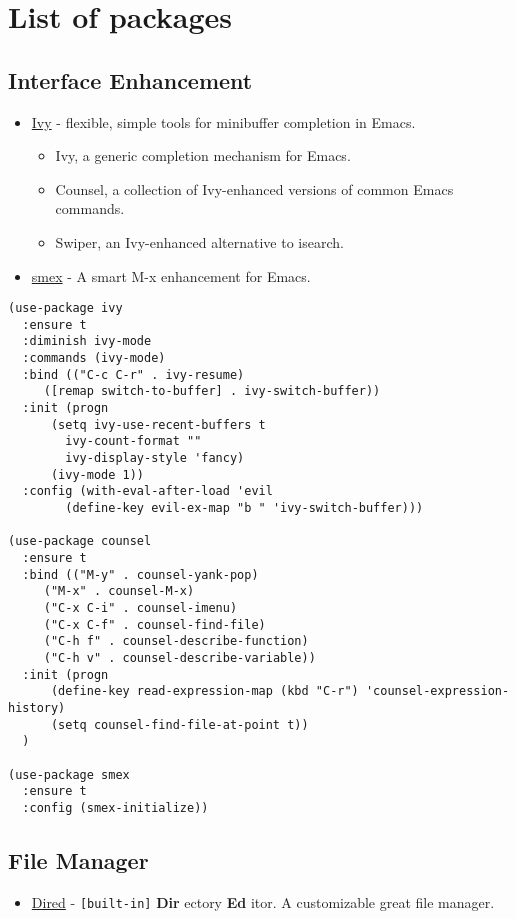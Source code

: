 \documentclass[11pt]{article}
\begin{document}
\section{List of packages}
\label{sec-1}

\subsection{Interface Enhancement}
\label{sec-1-1}
\begin{itemize}
\item \href{https://github.com/abo-abo/swiper}{Ivy} - flexible, simple tools for minibuffer completion in Emacs.
\begin{itemize}
\item Ivy, a generic completion mechanism for Emacs.
\item Counsel, a collection of Ivy-enhanced versions of common Emacs commands.
\item Swiper, an Ivy-enhanced alternative to isearch.
\end{itemize}
\item \href{https://github.com/nonsequitur/smex/}{smex} - A smart M-x enhancement for Emacs.
\end{itemize}
\begin{verbatim}
(use-package ivy
  :ensure t
  :diminish ivy-mode
  :commands (ivy-mode)
  :bind (("C-c C-r" . ivy-resume)
	 ([remap switch-to-buffer] . ivy-switch-buffer))
  :init (progn
	  (setq ivy-use-recent-buffers t
		ivy-count-format ""
		ivy-display-style 'fancy)
	  (ivy-mode 1))
  :config (with-eval-after-load 'evil
	    (define-key evil-ex-map "b " 'ivy-switch-buffer)))

(use-package counsel
  :ensure t
  :bind (("M-y" . counsel-yank-pop)
	 ("M-x" . counsel-M-x)
	 ("C-x C-i" . counsel-imenu)
	 ("C-x C-f" . counsel-find-file)
	 ("C-h f" . counsel-describe-function)
	 ("C-h v" . counsel-describe-variable))
  :init (progn
	  (define-key read-expression-map (kbd "C-r") 'counsel-expression-history)
	  (setq counsel-find-file-at-point t))
  )

(use-package smex
  :ensure t
  :config (smex-initialize))
\end{verbatim}

\subsection{File Manager}
\label{sec-1-2}
\begin{itemize}
\item \href{http://www.emacswiki.org/emacs/DiredMode}{Dired} - \texttt{[built-in]} \textbf{Dir} ectory \textbf{Ed} itor. A customizable great file manager.
\end{itemize}
\end{document}
